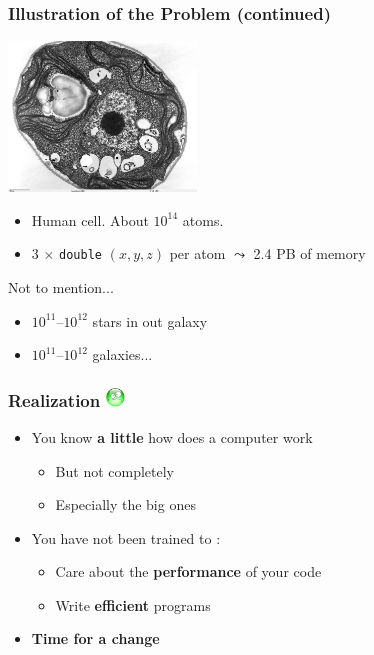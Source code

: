 \documentclass[xcolor={x11names,svgnames,psnames}]{beamer}
\newcommand{\triste}{\includegraphics[width=0.5cm,trim=0 17mm 0 0]{triste}}
\newcommand{\red}{\alert}
\begin{document}

\begin{frame}
\frametitle{Illustration of the Problem (continued)}

\begin{center}
\includegraphics[width=5cm]{cell.jpg}
\end{center}

\begin{itemize}
\item Human cell. About $10^{14}$ atoms.
\item 3 $\times$ \texttt{double} $(x, y, z)$ per atom $\leadsto$ 2.4 PB of memory
\end{itemize}

\medskip

\begin{alertblock}{Not to mention...}
  \begin{itemize}
  \item $10^{11}$--$10^{12}$ stars in out galaxy
  \item $10^{11}$--$10^{12}$ galaxies...
  \end{itemize}
\end{alertblock}

\end{frame}



\begin{frame}
  \frametitle{Realization \triste}

  \begin{itemize}
  \item You know \textbf{a little} how does a computer work
    \begin{itemize}
    \item But \red{not completely}
    \item Especially the big ones
    \end{itemize}

    \medskip
    
  \item You have not been trained to :
    \begin{itemize}
    \item \red{Care} about the \textbf{performance} of your code
    \item Write \textbf{efficient} programs
    \end{itemize}
    
    \pause
    \bigskip

    \item \Huge \textbf{Time for a change}
    \end{itemize}

\end{frame}
\end{document}
